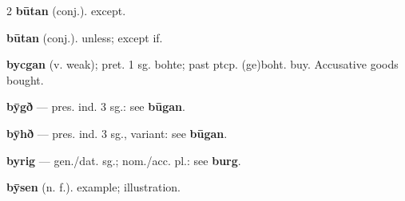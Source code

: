 \begin{multicols*}{2}
\textbf{būtan} (conj.). except.\par
\textbf{būtan} (conj.). unless; except if.\par
\textbf{bycgan} (v. weak); pret. 1 sg. bohte; past ptcp. (ge)boht. buy. Accusative goods bought.\par
\textbf{bȳgð} — pres. ind. 3 sg.: see \textbf{būgan}.\par
\textbf{bȳhð} — pres. ind. 3 sg., variant: see \textbf{būgan}.\par
\textbf{byrig} — gen./dat. sg.; nom./acc. pl.: see \textbf{burg}.\par
\textbf{bȳsen} (n. f.). example; illustration.\par

\end{multicols*}
